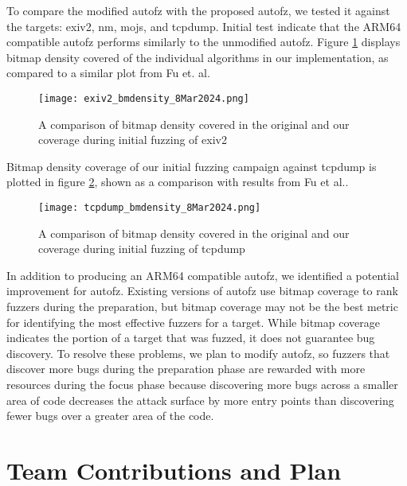 To compare the  modified autofz with the proposed autofz, we tested it against the targets: exiv2,
nm, mojs, and tcpdump. Initial test indicate that the ARM64 compatible autofz performs similarly to
the unmodified autofz. Figure \ref{fig:exiv2_bmdensity_8Mar2024} displays bitmap density covered of
the individual algorithms in our implementation, as compared to a similar plot from Fu et. al\cite{Fu}.

\begin{figure}
    \texttt{[image: exiv2\_bmdensity\_8Mar2024.png]}
    \centering
    \caption{A comparison of bitmap density covered in the original\cite{Fu} and our coverage during
     initial fuzzing of exiv2}
    \label{fig:exiv2_bmdensity_8Mar2024}
\end{figure}

Bitmap density coverage of our initial fuzzing campaign against tcpdump is plotted in figure
\ref{fig:tcpdump_bmdensity_8Mar2024}, shown as a comparison with results from Fu et al.\cite{Fu}.


\begin{figure}
    \texttt{[image: tcpdump\_bmdensity\_8Mar2024.png]}
    \centering
    \caption{A comparison of bitmap density covered in the original\cite{Fu} and our coverage during initial fuzzing of tcpdump}
    \label{fig:tcpdump_bmdensity_8Mar2024}
\end{figure}

In addition to producing an ARM64 compatible autofz, we identified a potential improvement for autofz.
Existing versions of autofz use bitmap coverage to rank fuzzers during the preparation, but bitmap
coverage may not be the best metric for identifying the most effective fuzzers for a target. While
bitmap coverage indicates the portion of a target that was fuzzed, it does not guarantee bug discovery.
To resolve these problems, we plan to modify autofz, so fuzzers that discover more bugs during the
preparation phase are rewarded with more resources during the focus phase because discovering more bugs
across a smaller area of code decreases the attack surface by more entry points than discovering fewer
bugs over a greater area of the code.

\section{Team Contributions and Plan}

